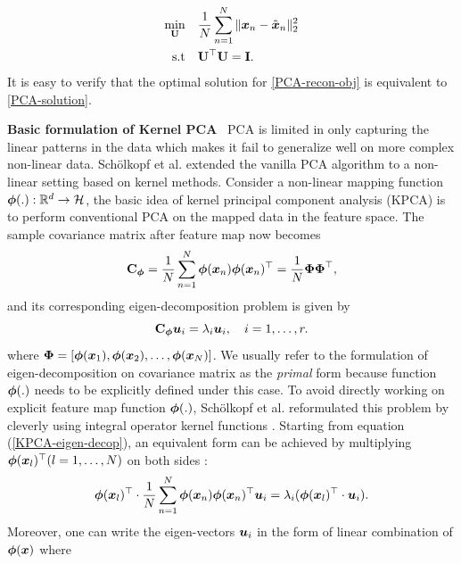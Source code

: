 \begin{equation}
    \begin{aligned}
        \min_{\mathbf{U}} & \quad \frac{1}{N}\sum_{n=1}^{N}\|\boldsymbol{x}_n-\tilde{\boldsymbol{x}}_n \|^2_2 \\
        \text{s.t}& \quad \mathbf{U}^\top \mathbf{U} = \mathbf{I}.
    \end{aligned}
    \label{PCA-recon-obj}
\end{equation}
It is easy to verify that the optimal solution for \ref{PCA-recon-obj} is equivalent to \ref{PCA-solution}. 

\noindent\textbf{Basic formulation of Kernel PCA} \ PCA is limited in only capturing the linear patterns in the data which makes it fail to generalize well on more complex non-linear data. Sch\"{o}lkopf et al. \cite{scholkopfKernelPrincipalComponent1997} extended the vanilla PCA algorithm to a non-linear setting based on kernel methods. Consider a non-linear mapping function $\boldsymbol{\phi}(.): \mathbb{R}^d\to \mathcal{H}$, the basic idea of kernel principal component analysis (KPCA) is to perform conventional PCA on the mapped data in the feature space. The sample covariance matrix after feature map now becomes 
\begin{equation}
    \mathbf{C}_{\boldsymbol{\phi}} = \frac{1}{N} \sum_{n=1}^{N} \boldsymbol{\phi}(\boldsymbol{x}_{n})\boldsymbol{\phi}(\boldsymbol{x}_{n})^\top = \frac{1}{N} \boldsymbol{\Phi} \boldsymbol{\Phi}^\top,
    \label{KPCA-eigen-decop}
\end{equation}
and its corresponding eigen-decomposition problem is given by
\begin{equation}
 \mathbf{C}_{\boldsymbol{\phi}}\boldsymbol{u}_i = \lambda_i\boldsymbol{u}_i, \quad i=1,\dots, r.
\end{equation}
where $\boldsymbol{\Phi} = [\boldsymbol{\phi}(\boldsymbol{x}_1),\boldsymbol{\phi}(\boldsymbol{x}_2),\dots,\boldsymbol{\phi}(\boldsymbol{x}_N)]$. We usually refer to the formulation of eigen-decomposition on covariance matrix as the \emph{primal} form because function $\boldsymbol{\phi}(.)$ needs to be explicitly defined under this case. To avoid directly working on explicit feature map function $\boldsymbol{\phi}(.)$, Sch\"{o}lkopf et al. reformulated this problem by cleverly using integral operator kernel functions \cite{scholkopfKernelPrincipalComponent1997}. Starting from equation (\ref{KPCA-eigen-decop}), an equivalent form can be achieved by multiplying $\boldsymbol{\phi}(\boldsymbol{x}_l)^\top (l = 1,\dots,N)$ on both sides : 
\begin{equation}
    \boldsymbol{\phi}(\boldsymbol{x}_l)^\top\cdot \frac{1}{N} \sum_{n=1}^{N} \boldsymbol{\phi}(\boldsymbol{x}_{n})\boldsymbol{\phi}(\boldsymbol{x}_{n})^\top\boldsymbol{u}_i = \lambda_i(\boldsymbol{\phi}(\boldsymbol{x}_l)^\top\cdot\boldsymbol{u}_i).
    \label{KPCA-dual-init}
\end{equation}
Moreover, one can write the eigen-vectors $\boldsymbol{u}_i$ in the form of linear combination of $\boldsymbol{\phi}(\boldsymbol{x})$ where
